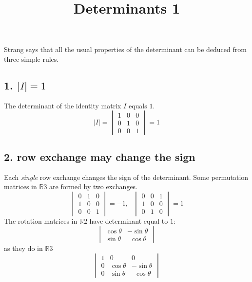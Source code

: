 \documentclass[11pt, oneside]{article}
\title{Determinants 1}
\date{}
\begin{document}
\maketitle
\Large

Strang says that all the usual properties of the determinant can be deduced from three simple rules.  \subsection*{1. $|I| =1$}
The determinant of the identity matrix $I$ equals $1$.
\[ 
|I| = 
\begin{vmatrix}
1  &  0 & 0 \\ 
0  &  1 & 0 \\
0 & 0 & 1  
 \end{vmatrix}
= 1
\]
\subsection*{2. row exchange may change the sign}
Each \emph{single} row exchange changes the sign of the determinant.  Some permutation matrices in $\mathbb{R}3$ are formed by two exchanges.
\[
\begin{vmatrix} 0  &  1 & 0 \\ 1  &  0 & 0 \\ 0 & 0  &  1 \end{vmatrix}
= -1, \ \ \ 
\begin{vmatrix} 0  &  0 & 1 \\ 1  &  0 & 0 \\ 0 & 1  &  0 \end{vmatrix}
= 1
\]
The rotation matrices in $\mathbb{R}2$ have determinant equal to $1$:
\[
\begin{vmatrix}
\cos \theta  &  -\sin \theta \\ 
\sin \theta  &  \ \ \cos \theta
 \end{vmatrix}
\]
as they do in $\mathbb{R}3$ 
\[
\begin{vmatrix}
1  &  0 & 0 \\ 
0  &  \cos \theta &  -\sin \theta \\ 
0 & \sin \theta & \ \ \cos \theta  
 \end{vmatrix}
 \]
\end{document}
